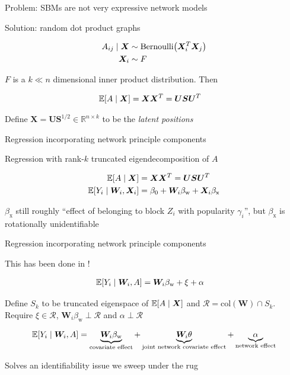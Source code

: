 \documentclass{beamer}
\theoremstyle{remark}
\newcommand{\X}{\bm X}
\newcommand{\W}{\bm W}
\newcommand{\Spop}{\bm S}
\newcommand{\Upop}{\bm U}
\newcommand{\betazero}{\beta_0}
\newcommand \cond {\mid}
\newcommand \dist {\sim}
\DeclarePairedDelimiter{\paren}{(}{)}
\DeclarePairedDelimiter{\brac}{[}{]}
\newcommand{\E}[2][]{%
   \ifthenelse{ \equal{#1}{} }
      {\ensuremath{\mathbb{E} \brac*{#2}}}
      {\ensuremath{\mathbb{E} \brac*{#2 \mid #1}}}
}
\begin{document}
\begin{frame}{Problem: SBMs are not very expressive network models}

    Solution: random dot product graphs

    \begin{align*}
        A_{ij} \cond \X & \dist \mathrm{Bernoulli} \paren*{\X_i^T \X_j} \\
        \X_i            & \dist F
    \end{align*}

    $F$ is a $k \ll n$ dimensional inner product distribution. Then

    \begin{align*}
        \E[\X]{A} & = \X \X^T = \Upop \Spop \Upop^T
    \end{align*}

    Define $\X = \Upop \Spop^{1/2} \in \mathbb{R}^{n \times k}$ to be the \emph{latent positions}

\end{frame}

\begin{frame}{Regression incorporating network principle components}

    Regression with rank-$k$ truncated eigendecomposition of $A$

    \begin{align*}
        \E[\X]{A}           & = \X \X^T = \Upop \Spop \Upop^T                         \\
        \E[\W_i, \X_i]{Y_i} & = \betazero + \W_i \beta_\text{w} + \X_i \beta_\text{x}
    \end{align*}

    $\beta_\text{x}$ still roughly ``effect of belonging to block $Z_i$ with popularity $\gamma_i$'', but $\beta_\text{x}$ is rotationally unidentifiable

\end{frame}

\begin{frame}{Regression incorporating network principle components}

    This has been done in \cite{le_linear_2021}!

    \begin{align*}
        \E[\W_i, A]{Y_i} & = \W_i \beta_\text{w} + \xi + \alpha
    \end{align*}

    Define $S_k$ to be truncated eigenspace of $\E[\X]{A}$ and  $\mathcal R = \mathrm{col}(\W) \cap S_k$. Require $\xi \in \mathcal R$, $\W_i \beta_\text{w} \perp \mathcal R$ and $\alpha \perp \mathcal R$

    \begin{align*}
        \E[\W_i, A]{Y_i} =
        \underbrace{\W_i \beta_\text{w}}_\text{covariate effect} +
        \underbrace{\W_i \theta}_\text{joint network covariate effect} +
        \underbrace{\alpha}_\text{network effect}
    \end{align*}

    Solves an identifiability issue we sweep under the rug
\end{frame}
\end{document}
